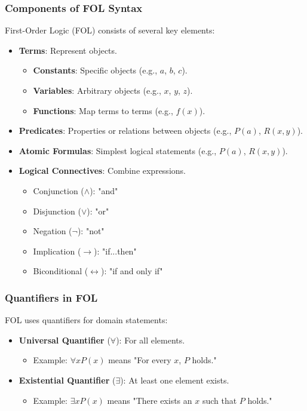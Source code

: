 \documentclass[aspectratio=169]{beamer}
\begin{document}
\begin{frame}[fragile]
    \frametitle{Components of FOL Syntax}
    First-Order Logic (FOL) consists of several key elements:
    \begin{itemize}
        \item \textbf{Terms}: Represent objects.
        \begin{itemize}
            \item \textbf{Constants}: Specific objects (e.g., $a$, $b$, $c$).
            \item \textbf{Variables}: Arbitrary objects (e.g., $x$, $y$, $z$).
            \item \textbf{Functions}: Map terms to terms (e.g., $f(x)$).
        \end{itemize}
        \item \textbf{Predicates}: Properties or relations between objects (e.g., $P(a)$, $R(x, y)$).
        \item \textbf{Atomic Formulas}: Simplest logical statements (e.g., $P(a)$, $R(x, y)$).
        \item \textbf{Logical Connectives}: Combine expressions.
        \begin{itemize}
            \item Conjunction ($\land$): "and"
            \item Disjunction ($\lor$): "or"
            \item Negation ($\lnot$): "not"
            \item Implication ($\rightarrow$): "if...then"
            \item Biconditional ($\leftrightarrow$): "if and only if"
        \end{itemize}
    \end{itemize}
\end{frame}

\begin{frame}[fragile]
    \frametitle{Quantifiers in FOL}
    FOL uses quantifiers for domain statements:
    \begin{itemize}
        \item \textbf{Universal Quantifier} ($\forall$): For all elements.
        \begin{itemize}
            \item Example: $\forall x P(x)$ means "For every $x$, $P$ holds."
        \end{itemize}
        \item \textbf{Existential Quantifier} ($\exists$): At least one element exists.
        \begin{itemize}
            \item Example: $\exists x P(x)$ means "There exists an $x$ such that $P$ holds."
        \end{itemize}
    \end{itemize}
\end{frame}
\end{document}
